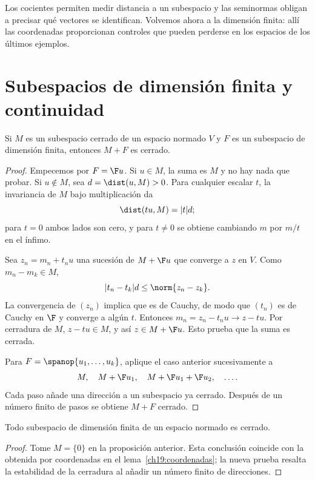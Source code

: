 Los cocientes permiten medir distancia a un subespacio y las seminormas obligan a precisar qué vectores se identifican. Volvemos ahora a la dimensión finita: allí las coordenadas proporcionan controles que pueden perderse en los espacios de los últimos ejemplos.

\section{Subespacios de dimensión finita y continuidad}\label{lectura:22}\label{sec:nuevo08:finita}

\begin{proposicion}\label{ch22:suma-cerrada}
Si $M$ es un subespacio cerrado de un espacio normado $V$ y $F$ es un subespacio de dimensión finita, entonces $M+F$ es cerrado.
\end{proposicion}
\begin{proof}
Empecemos por $F=\F u$. Si $u\in M$, la suma es $M$ y no hay nada que probar. Si $u\notin M$, sea $d=\dist(u,M)>0$. Para cualquier escalar $t$, la invariancia de $M$ bajo multiplicación da
\[
 \dist(tu,M)=|t|d;
\]
para $t=0$ ambos lados son cero, y para $t\ne0$ se obtiene cambiando $m$ por $m/t$ en el ínfimo.

Sea $z_n=m_n+t_nu$ una sucesión de $M+\F u$ que converge a $z$ en $V$. Como $m_n-m_k\in M$,
\[
 |t_n-t_k|d\leq\norm{z_n-z_k}.
\]
La convergencia de $(z_n)$ implica que es de Cauchy, de modo que $(t_n)$ es de Cauchy en $\F$ y converge a algún $t$. Entonces $m_n=z_n-t_nu\to z-tu$. Por cerradura de $M$, $z-tu\in M$, y así $z\in M+\F u$. Esto prueba que la suma es cerrada.

Para $F=\spanop\{u_1,\ldots,u_k\}$, aplique el caso anterior sucesivamente a
\[
 M,\quad M+\F u_1,\quad M+\F u_1+\F u_2,\quad\ldots.
\]
Cada paso añade una dirección a un subespacio ya cerrado. Después de un número finito de pasos se obtiene $M+F$ cerrado.
\end{proof}

\begin{corolario}\label{ch22:finito-cerrado}
Todo subespacio de dimensión finita de un espacio normado es cerrado.
\end{corolario}
\begin{proof}
Tome $M=\{0\}$ en la proposición anterior. Esta conclusión coincide con la obtenida por coordenadas en el lema~\ref{ch19:coordenadas}; la nueva prueba resalta la estabilidad de la cerradura al añadir un número finito de direcciones.
\end{proof}



